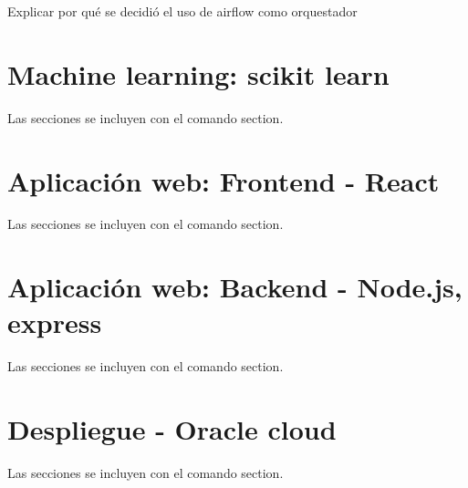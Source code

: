 Explicar por qué se decidió el uso de airflow como orquestador

\section{Machine learning: scikit learn}

Las secciones se incluyen con el comando section.

\section{Aplicación web: Frontend - React}

Las secciones se incluyen con el comando section.

\section{Aplicación web: Backend - Node.js, express}

Las secciones se incluyen con el comando section.

\section{Despliegue - Oracle cloud}

Las secciones se incluyen con el comando section.
